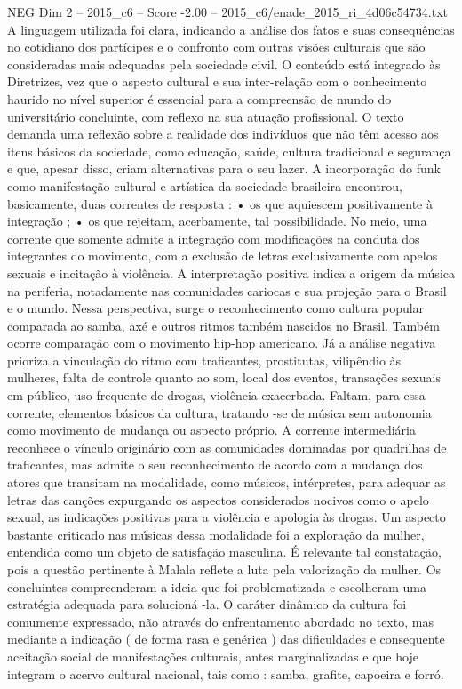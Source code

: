 \begin{textsample}{NEG Dim 2 – 2015\_c6 – Score -2.00 – 2015\_c6/enade\_2015\_ri\_4d06c54734.txt}
A linguagem utilizada foi clara, indicando a análise dos fatos e suas consequências no cotidiano dos partícipes e o confronto com outras visões culturais que são consideradas mais adequadas pela sociedade civil.
O conteúdo está integrado às Diretrizes, vez que o aspecto cultural e sua inter-relação com o conhecimento haurido no nível superior é essencial para a compreensão de mundo do universitário concluinte, com reflexo na sua atuação profissional.
O texto demanda uma reflexão sobre a realidade dos indivíduos que não têm acesso aos itens básicos da sociedade, como educação, saúde, cultura tradicional e segurança e que, apesar disso, criam alternativas para o seu lazer.
A incorporação do funk como manifestação cultural e artística da sociedade brasileira encontrou, basicamente, duas correntes de resposta : • os que aquiescem positivamente à integração ; • os que rejeitam, acerbamente, tal possibilidade.
No meio, uma corrente que somente admite a integração com modificações na conduta dos integrantes do movimento, com a exclusão de letras exclusivamente com apelos sexuais e incitação à violência.
A interpretação positiva indica a origem da música na periferia, notadamente nas comunidades cariocas e sua projeção para o Brasil e o mundo.
Nessa perspectiva, surge o reconhecimento como cultura popular comparada ao samba, axé e outros ritmos também nascidos no Brasil.
Também ocorre comparação com o movimento hip-hop americano.
Já a análise negativa prioriza a vinculação do ritmo com traficantes, prostitutas, vilipêndio às mulheres, falta de controle quanto ao som, local dos eventos, transações sexuais em público, uso frequente de drogas, violência exacerbada.
Faltam, para essa corrente, elementos básicos da cultura, tratando -se de música sem autonomia como movimento de mudança ou aspecto próprio.
A corrente intermediária reconhece o vínculo originário com as comunidades dominadas por quadrilhas de traficantes, mas admite o seu reconhecimento de acordo com a mudança dos atores que transitam na modalidade, como músicos, intérpretes, para adequar as letras das canções expurgando os aspectos considerados nocivos como o apelo sexual, as indicações positivas para a violência e apologia às drogas.
Um aspecto bastante criticado nas músicas dessa modalidade foi a exploração da mulher, entendida como um objeto de satisfação masculina.
É relevante tal constatação, pois a questão pertinente à Malala reflete a luta pela valorização da mulher.
Os concluintes compreenderam a ideia que foi problematizada e escolheram uma estratégia adequada para solucioná -la.
O caráter dinâmico da cultura foi comumente expressado, não através do enfrentamento abordado no texto, mas mediante a indicação ( de forma rasa e genérica ) das dificuldades e consequente aceitação social de manifestações culturais, antes marginalizadas e que hoje integram o acervo cultural nacional, tais como : samba, grafite, capoeira e forró.

\end{textsample}
